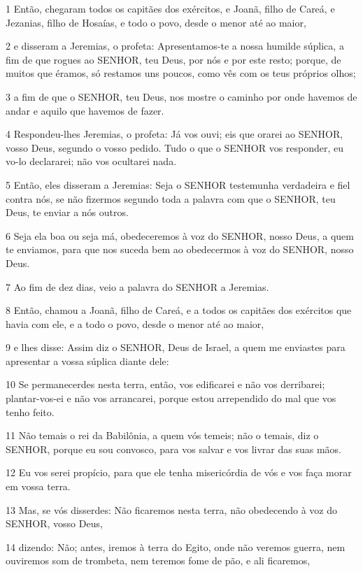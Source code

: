 \par 1 Então, chegaram todos os capitães dos exércitos, e Joanã, filho de Careá, e Jezanias, filho de Hosaías, e todo o povo, desde o menor até ao maior,
\par 2 e disseram a Jeremias, o profeta: Apresentamos-te a nossa humilde súplica, a fim de que rogues ao SENHOR, teu Deus, por nós e por este resto; porque, de muitos que éramos, só restamos uns poucos, como vês com os teus próprios olhos;
\par 3 a fim de que o SENHOR, teu Deus, nos mostre o caminho por onde havemos de andar e aquilo que havemos de fazer.
\par 4 Respondeu-lhes Jeremias, o profeta: Já vos ouvi; eis que orarei ao SENHOR, vosso Deus, segundo o vosso pedido. Tudo o que o SENHOR vos responder, eu vo-lo declararei; não vos ocultarei nada.
\par 5 Então, eles disseram a Jeremias: Seja o SENHOR testemunha verdadeira e fiel contra nós, se não fizermos segundo toda a palavra com que o SENHOR, teu Deus, te enviar a nós outros.
\par 6 Seja ela boa ou seja má, obedeceremos à voz do SENHOR, nosso Deus, a quem te enviamos, para que nos suceda bem ao obedecermos à voz do SENHOR, nosso Deus.
\par 7 Ao fim de dez dias, veio a palavra do SENHOR a Jeremias.
\par 8 Então, chamou a Joanã, filho de Careá, e a todos os capitães dos exércitos que havia com ele, e a todo o povo, desde o menor até ao maior,
\par 9 e lhes disse: Assim diz o SENHOR, Deus de Israel, a quem me enviastes para apresentar a vossa súplica diante dele:
\par 10 Se permanecerdes nesta terra, então, vos edificarei e não vos derribarei; plantar-vos-ei e não vos arrancarei, porque estou arrependido do mal que vos tenho feito.
\par 11 Não temais o rei da Babilônia, a quem vós temeis; não o temais, diz o SENHOR, porque eu sou convosco, para vos salvar e vos livrar das suas mãos.
\par 12 Eu vos serei propício, para que ele tenha misericórdia de vós e vos faça morar em vossa terra.
\par 13 Mas, se vós disserdes: Não ficaremos nesta terra, não obedecendo à voz do SENHOR, vosso Deus,
\par 14 dizendo: Não; antes, iremos à terra do Egito, onde não veremos guerra, nem ouviremos som de trombeta, nem teremos fome de pão, e ali ficaremos,
